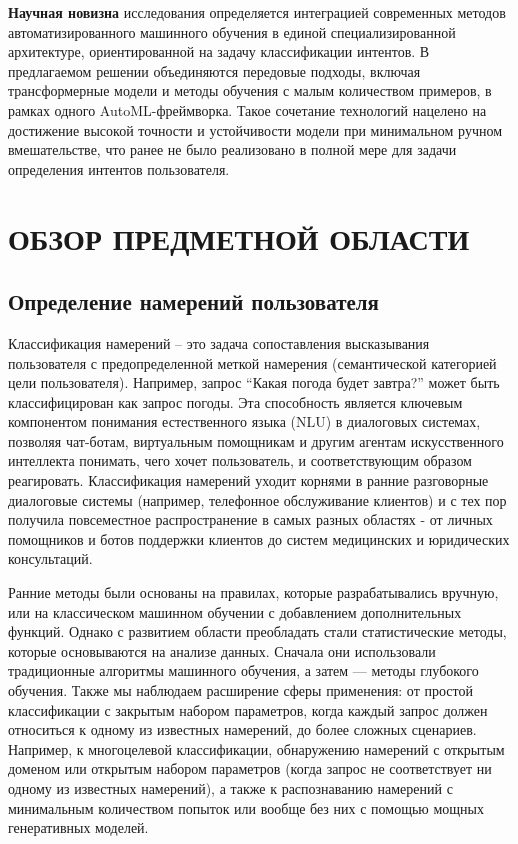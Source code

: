 \documentclass[14pt,a4paper,oneside,openany]{extbook}
\begin{document}
\textbf{Научная новизна} исследования определяется интеграцией современных методов автоматизированного машинного обучения в единой специализированной архитектуре, ориентированной на задачу классификации интентов. В предлагаемом решении объединяются передовые подходы, включая трансформерные модели и методы обучения с малым количеством примеров, в рамках одного AutoML-фреймворка. Такое сочетание технологий нацелено на достижение высокой точности и устойчивости модели при минимальном ручном вмешательстве, что ранее не было реализовано в полной мере для задачи определения интентов пользователя.
\chapter{ОБЗОР ПРЕДМЕТНОЙ ОБЛАСТИ}
\label{sec:orge2e1362}
\section{Определение намерений пользователя}
\label{sec:org075dadb}
Классификация намерений –  это задача сопоставления высказывания пользователя с предопределенной меткой намерения (семантической категорией цели пользователя). Например, запрос “Какая погода будет завтра?” может быть классифицирован как запрос погоды. Эта способность является ключевым компонентом понимания естественного языка (NLU) в диалоговых системах, позволяя чат-ботам, виртуальным помощникам и другим агентам искусственного интеллекта понимать, чего хочет пользователь, и соответствующим образом реагировать. Классификация намерений уходит корнями в ранние разговорные диалоговые системы (например, телефонное обслуживание клиентов) и с тех пор получила повсеместное распространение в самых разных областях - от личных помощников и ботов поддержки клиентов до систем медицинских и юридических консультаций.

Ранние методы были основаны на правилах, которые разрабатывались вручную, или на классическом машинном обучении с добавлением дополнительных функций. Однако с развитием области преобладать стали статистические методы, которые основываются на анализе данных. Сначала они использовали традиционные алгоритмы машинного обучения, а затем — методы глубокого обучения. Также мы наблюдаем расширение сферы применения: от простой классификации с закрытым набором параметров, когда каждый запрос должен относиться к одному из известных намерений, до более сложных сценариев. Например, к многоцелевой классификации, обнаружению намерений с открытым доменом или открытым набором параметров (когда запрос не соответствует ни одному из известных намерений), а также к распознаванию намерений с минимальным количеством попыток или вообще без них с помощью мощных генеративных моделей.
\end{document}
